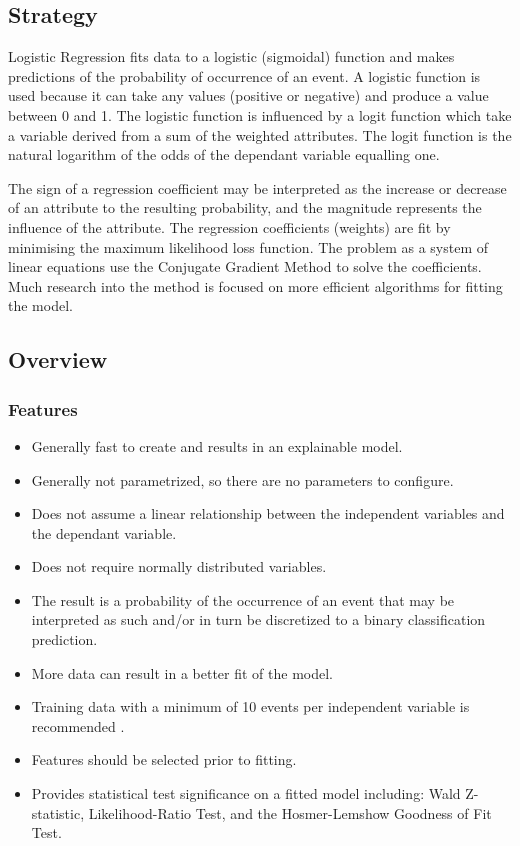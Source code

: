 \subsection{Strategy}
Logistic Regression fits data to a logistic (sigmoidal) function and makes predictions of the probability of occurrence of an event. 
A logistic function is used because it can take any values (positive or negative) and produce a value between 0 and 1. The logistic function is influenced by a logit function which take a variable derived from a sum of the weighted attributes. The logit function is the natural logarithm of the odds of the dependant variable equalling one.

The sign of a regression coefficient may be interpreted as the increase or decrease of an attribute to the resulting probability, and the magnitude represents the influence of the attribute.
The regression coefficients (weights) are fit by minimising the maximum likelihood loss function. The problem as a system of linear equations use the Conjugate Gradient Method to solve the coefficients. Much research into the method is focused on more efficient algorithms for fitting the model.


\subsection{Overview}

\subsubsection{Features}

\begin{itemize}
	\item Generally fast to create and results in an explainable model.
	\item Generally not parametrized, so there are no parameters to configure. 
	\item Does not assume a linear relationship between the independent variables and the dependant variable. 
	\item Does not require normally distributed variables.
	\item The result is a probability of the occurrence of an event that may be interpreted as such and/or in turn be discretized to a binary classification prediction.
	\item More data can result in a better fit of the model.
	\item Training data with a minimum of 10 events per independent variable is recommended \cite{Peduzzi1996}.
	\item Features should be selected prior to fitting.
	\item Provides statistical test significance on a fitted model including: Wald Z-statistic, Likelihood-Ratio Test, and the Hosmer-Lemshow Goodness of Fit Test.
\end{itemize}

